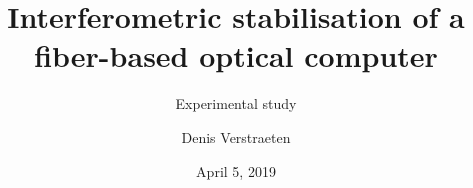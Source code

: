 




\title{Interferometric stabilisation of a fiber-based optical computer}
\subtitle{Experimental study}
\author{Denis Verstraeten}
\date{April 5, 2019}



	\begin{frame}[plain]
		\titlepage
	\end{frame}
	
	
	
	
	
	
	

	


	


	

	
	\begin{frame}[t, allowframebreaks]
		\printbibliography[heading=none]
	\end{frame}
	

